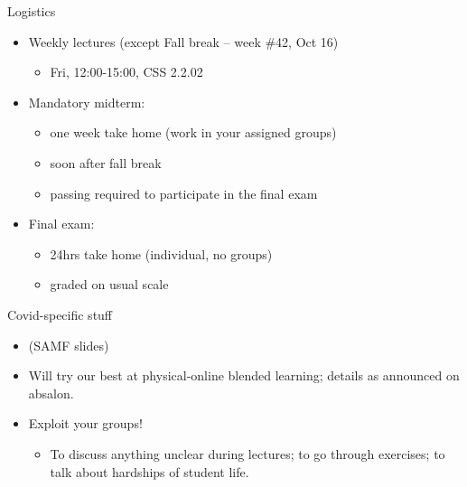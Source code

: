 \documentclass[english,10pt
,aspectratio=169
]{beamer}
\begin{document}
\begin{frame}{Logistics}
\begin{itemize}
	\item Weekly lectures (except Fall break -- week \#42, Oct 16)
	\begin{itemize}
		\item Fri, 12:00-15:00, CSS 2.2.02
	\end{itemize}
	
	\pause
	\item Mandatory midterm:
	\begin{itemize}
		\item one week take home (work in your assigned groups)
		\item soon after fall break
		\item passing required to participate in the final exam
	\end{itemize}
	
	\item Final exam:
	\begin{itemize}
		\item 24hrs take home (individual, no groups)
		\item graded on usual scale
	\end{itemize}
\end{itemize}
\end{frame}


\begin{frame}{Covid-specific stuff}
	\begin{itemize}
		\item (SAMF slides)
		\item Will try our best at physical-online blended learning; details as announced on absalon.
		\item Exploit your groups!
		\begin{itemize}
			\item To discuss anything unclear during lectures; to go through exercises; to talk about hardships of student life.
		\end{itemize}
	\end{itemize}
\end{frame}
\end{document}
